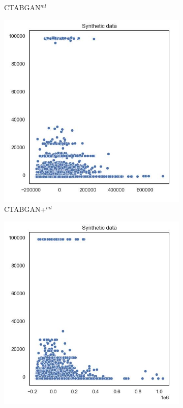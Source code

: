 \begin{figure}[H]
\begin{subfigure}{0.3\textwidth}
		\caption{CTABGAN$^{ml}$}
	\end{subfigure}
	\begin{subfigure}{0.3\textwidth}
		\centering
		\includegraphics[width=\textwidth]{images/pca/ctabgan+.jpg}
		\caption{CTABGAN+$^{ml}$}
	\end{subfigure}
	\begin{subfigure}{0.3\textwidth}
		\centering
		\includegraphics[width=\textwidth]{images/pca/smote.jpg}

\end{subfigure}
\end{figure}
